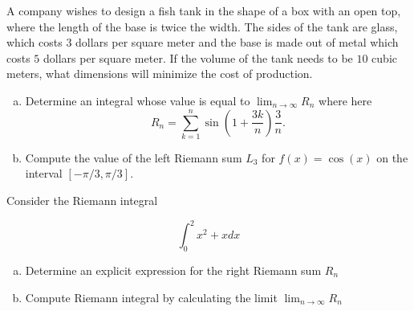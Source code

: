 \documentclass[11pt]{exam}
\theoremstyle{definition}
\begin{document}
\begin{questions}
\newpage
\question[10]\mbox{}

A company wishes to design a fish tank in the shape of a box with an open top, where the length of the base is twice the width.
The sides of the tank are glass, which costs $3$ dollars per square meter and the base is made out of metal which costs $5$ dollars per square meter.
If the volume of the tank needs to be $10$ cubic meters, what dimensions will minimize the cost of production.


\newpage
\question[10]\mbox{}

\begin{enumerate}[(a)]
\item  Determine an integral whose value is equal to $\lim_{n\rightarrow\infty} R_n$ where here
$$R_n = \sum_{k=1}^n \sin\left(1 + \frac{3k}{n}\right) \frac{3}{n}.$$
\vspace{3in}
\item  Compute the value of the left Riemann sum $L_3$ for $f(x) = \cos(x)$ on the interval $[-\pi/3,\pi/3]$.
\end{enumerate}

\newpage
\question[10]\mbox{}

Consider the Riemann integral

$$\int_0^2 x^2 + x dx$$

\begin{enumerate}[(a)]
\item  Determine an explicit expression for the right Riemann sum $R_n$
\vspace{4in}
\item  Compute Riemann integral by calculating the limit $\lim_{n\rightarrow\infty} R_n$
\end{enumerate}



\end{questions}
\end{document}
